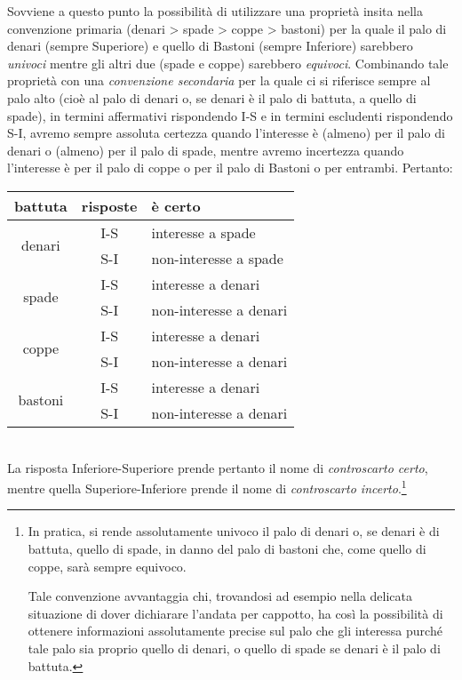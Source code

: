 \documentclass[italian,a4paper]{article}
\begin{document}
Sovviene a questo punto la possibilità di utilizzare una proprietà
insita nella convenzione primaria (denari > spade > coppe > bastoni) per
la quale il palo di denari (sempre Superiore) e quello di Bastoni
(sempre Inferiore) sarebbero \emph{univoci} mentre gli altri due
(spade e coppe) sarebbero \emph{equivoci}. Combinando tale proprietà con
una \emph{convenzione secondaria} per la quale ci si riferisce sempre al
palo alto (cioè al palo di denari o, se denari è il palo di battuta, a
quello di spade), in termini affermativi rispondendo I-S e in termini escludenti rispondendo S-I, avremo sempre assoluta certezza quando l'interesse è (almeno) per il palo di denari o (almeno) per il palo di spade, mentre avremo incertezza quando l'interesse è per il palo di coppe o per il palo di Bastoni o per entrambi. Pertanto:
\begin{table}[h]
    \centering
    \begin{tabular}{*2c l}
        battuta & risposte & è certo\\\hline
        \multirow{2}{*}{denari} & I-S & interesse a spade\\
        & S-I & non-interesse a spade\\    \hline
        \multirow{2}{*}{spade} & I-S & interesse a denari\\
        & S-I & non-interesse a denari\\        \hline
        \multirow{2}{*}{coppe} & I-S & interesse a denari\\
        & S-I & non-interesse a denari\\             \hline
        \multirow{2}{*}{bastoni} & I-S & interesse a denari\\
        & S-I & non-interesse a denari\\                  \hline
    \end{tabular}
\end{table}\\
La risposta Inferiore-Superiore prende pertanto il nome di
\emph{controscarto certo}, mentre quella Superiore-Inferiore  prende il
nome di \emph{controscarto incerto}.\footnote{In pratica, si rende assolutamente univoco il palo di denari o, se denari è di battuta, quello di spade, in danno del palo di bastoni che, come quello di coppe, sarà sempre equivoco.

Tale convenzione avvantaggia chi, trovandosi ad esempio nella delicata situazione di dover dichiarare l’andata per cappotto, ha così la possibilità di ottenere informazioni assolutamente precise sul palo che gli interessa purché tale palo sia proprio quello di denari, o quello di spade se denari è il palo di battuta.}
\end{document}
